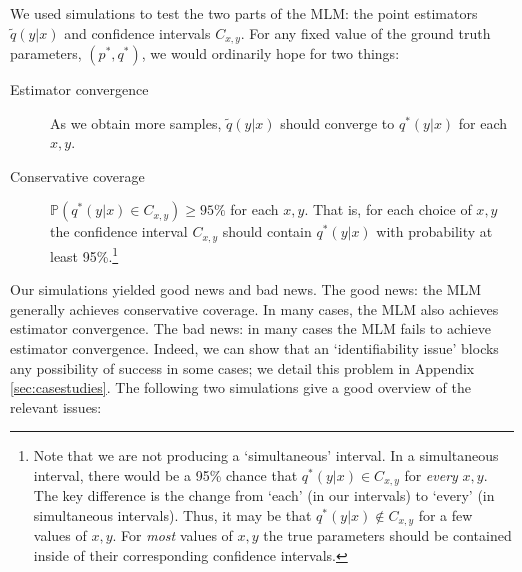 We used simulations to test the two parts of the MLM: the point estimators $\tilde q(y|x)$ and confidence intervals $C_{x,y}$.  For any fixed value of the ground truth parameters, $(p^*,q^*)$, we would ordinarily hope for two things:
\begin{description}
    \item[Estimator convergence] As we obtain more samples, $\tilde q(y|x)$ should converge to $q^*(y|x)$ for each $x,y$.
    \item[Conservative coverage] $\mathbb{P}(q^*(y|x) \in C_{x,y})\geq95\%$ for each $x,y$.  That is, for each choice of $x,y$ the confidence interval $C_{x,y}$ should contain $q^*(y|x)$ with probability at least 95\%.\footnote{Note that we are not producing a `simultaneous' interval.  In a simultaneous interval, there would be a 95\% chance that $q^*(y|x)\in C_{x,y}$ for \emph{every} $x,y$.  The key difference is the change from `each' (in our intervals) to `every' (in simultaneous intervals).  Thus, it may be that $q^*(y|x)\notin C_{x,y}$ for a few values of $x,y$.  For \emph{most} values of $x,y$ the true parameters should be contained inside of their corresponding confidence intervals.}
\end{description}
Our simulations yielded good news and bad news.  The good news: the MLM generally achieves conservative coverage.  In many cases, the MLM also achieves estimator convergence.  The bad news: in many cases the MLM fails to achieve estimator convergence.  Indeed, we can show that an `identifiability issue' blocks any possibility of success in some cases; we detail this problem in Appendix \ref{sec:casestudies}.  The following two simulations give a good overview of the relevant issues:

